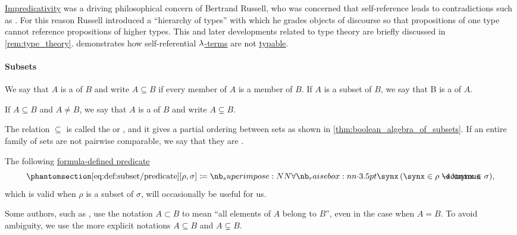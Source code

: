 \begin{remark}\label{rem:self_reference}
  \hyperref[con:impredicativity]{Impredicativity} was a driving philosophical concern of Bertrand Russell, who was concerned that self-reference leads to contradictions such as . For this reason Russell introduced a \enquote{hierarchy of types} with which he grades objects of discourse so that propositions of one type cannot reference propositions of higher types. This and later developments related to type theory are briefly discussed in \cref{rem:type_theory}.  demonstrates how self-referential \hyperref[def:lambda_term]{\( {\mathrm \lambda} \)-terms} are not \hyperref[def:typability]{typable}.
\end{remark}

\paragraph{Subsets}

\begin{definition}\label{def:subset}
  We say that \( A \) is a  of \( B \) and write \( A \subseteq B \) if every member of \( A \) is a member of \( B \). If \( A \) is a subset of \( B \), we say that B is a  of \( A \).

  If \( A \subseteq B \) and \( A \neq B \), we say that \( A \) is a  of \( B \) and write \( A \subsetneq B \).

  The relation \( \subseteq \) is called the  or , and it gives a partial ordering between sets as shown in \cref{thm:boolean_algebra_of_subsets}. If an entire family of sets are not pairwise comparable, we say that they are .

  The following \hyperref[con:formula_defined_predicate]{formula-defined predicate}
  \begin{equation*}\taglabel[\op{IsSubset}]{eq:def:subset/predicate}
    \ref{eq:def:subset/predicate}[\rho, \sigma] \coloneqq \qforall \synx (\synx \in \rho \synimplies \synx \in \sigma),
  \end{equation*}
  which is valid when \( \rho \) is a subset of \( \sigma \), will occasionally be useful for us.
\end{definition}
\begin{comments}
  \item Some authors, such as \cite{Kelley1975GeneralTopology}, use the notation \( A \subset B \) to mean \enquote{all elements of \( A \) belong to \( B \)}, even in the case when \( A = B \). To avoid ambiguity, we use the more explicit notations \( A \subseteq B \) and \( A \subsetneq B \).
\end{comments}

